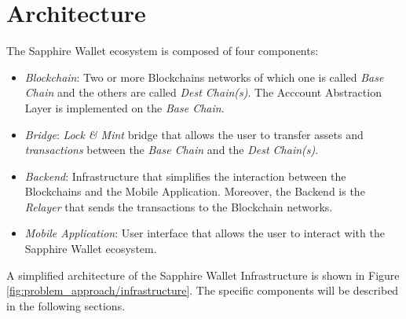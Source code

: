 \section{Architecture}
\label{sec:architecture}

The Sapphire Wallet ecosystem is composed of four components:

\begin{itemize}
    \item \textit{Blockchain}: Two or more Blockchains networks of which one is called \textit{Base Chain} and the others are called \textit{Dest Chain(s)}. The Acccount Abstraction Layer is implemented on the \textit{Base Chain}.
    \item \textit{Bridge}: \textit{Lock \& Mint} bridge that allows the user to transfer assets and \textit{transactions} between the \textit{Base Chain} and the \textit{Dest Chain(s)}.
    \item \textit{Backend}: Infrastructure that simplifies the interaction between the Blockchains and the Mobile Application. Moreover, the Backend is the \textit{Relayer} that sends the transactions to the Blockchain networks.
    \item \textit{Mobile Application}: User interface that allows the user to interact with the Sapphire Wallet ecosystem.
\end{itemize}

A simplified architecture of the Sapphire Wallet Infrastructure is shown in Figure \ref{fig:problem_approach/infrastructure}. The specific components will be described in the following sections.

